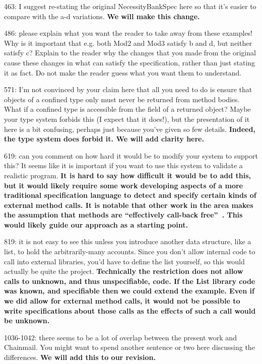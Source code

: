 \documentclass[11pt]{amsart}
\newcommand{\us}[1]{\bf #1}
\begin{document}
463: I suggest re-stating the original NecessityBankSpec here so that it’s easier to compare with the a-d variations.
{\us{We will make this change.}}

486: please explain what you want the reader to take away from these examples! Why is it important that e.g. both Mod2 and Mod3 satisfy b and d, but neither satisfy c? Explain to the reader why the changes that you made from the original cause these changes in what can satisfy the specification, rather than just stating it as fact. Do not make the reader guess what you want them to understand.

571: I’m not convinced by your claim here that all you need to do is ensure that objects of a confined type only must never be returned from method bodies. What if a confined type is accessible from the field of a returned object? Maybe your type system forbids this (I expect that it does!), but the presentation of it here is a bit confusing, perhaps just because you’ve given so few details.
{\us{Indeed, the type system does forbid it. We will add clarity here.}}

619: can you comment on how hard it would be to modify your system to support this? It seems like it is important if you want to use this system to validate a realistic program.
{\us{It is hard to say how difficult it would be to add this, but it would likely require some work developing aspects of a more traditional specification language to detect 
and specify certain kinds of external method calls. It is notable that other work in the area makes the assumption that methods are ``effectively call-back free''~\citep{Permenev}. 
This would likely guide our approach as a starting point.}}

819: it is not easy to see this unless you introduce another data structure, like a list, to hold the arbitrarily-many accounts. Since you don’t allow internal code to call into external libraries, you’d have to define the list yourself, so this would actually be quite the project.
{\us{Technically the restriction does not allow calls to unknown, and thus unspecifiable, code. If the List library code was known, 
and specifiable then we could extend the example. Even if we did allow for external method calls, it would not be possible to write
specifications about those calls as the effects of such a call would be unknown.}}

1036-1042: there seems to be a lot of overlap between the present work and Chainmail. You might want to spend another sentence or two here discussing the differences.
{\us{We will add this to our revision.}}
  
\end{document}
